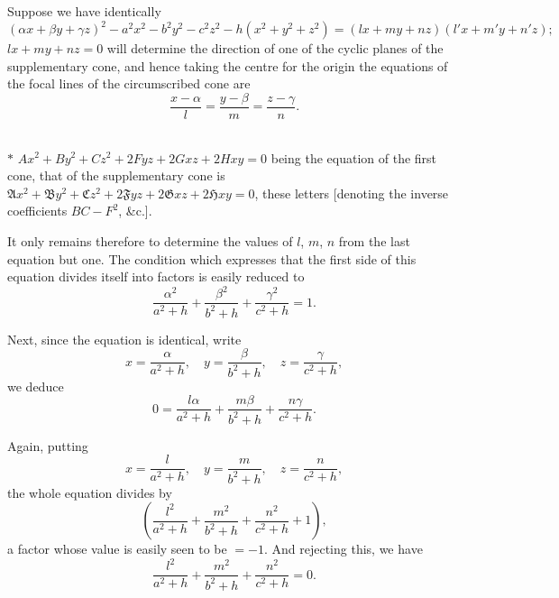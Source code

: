 \documentclass[11pt]{article}
\begin{document}
Suppose we have identically
\[
(\alpha x + \beta y + \gamma z)^{2} - a^{2} x^{2} - b^{2} y^{2} - c^{2} z^{2} - h(x^{2} + y^{2} + z^{2}) = (l x + m y + n z)(l' x + m' y + n' z);
\]
$l x + m y + n z = 0$ will determine the direction of one of the cyclic planes of the supple\-mentary
cone, and hence taking the centre for the origin the equations of the focal
lines of the circumscribed cone are
\[
\frac{x - \alpha}{l} = \frac{y - \beta}{m} = \frac{z - \gamma}{n}.
\]

\medskip
\noindent\hrulefill\\
\footnotesize
$*$ $A x^{2} + B y^{2} + C z^{2} + 2 F y z + 2 G x z + 2 H x y = 0$ being the equation of the first cone, that of the supplementary
cone is $\mathfrak{A} x^{2} + \mathfrak{B} y^{2} + \mathfrak{C} z^{2} + 2 \mathfrak{F} y z + 2 \mathfrak{G} x z + 2 \mathfrak{H} x y = 0$, these letters [denoting the inverse coefficients $BC - F^{2}$, \&c.].
\normalsize

\bigskip

\noindent It only remains therefore to determine the values of $l$, $m$, $n$ from the last equation
but one. The condition which expresses that the first side of this equation divides
itself into factors is easily reduced to
\[
\frac{\alpha^{2}}{a^{2} + h} + \frac{\beta^{2}}{b^{2} + h} + \frac{\gamma^{2}}{c^{2} + h} = 1. \tag{A}
\]

Next, since the equation is identical, write
\[
x = \frac{\alpha}{a^{2} + h}, \quad y = \frac{\beta}{b^{2} + h}, \quad z = \frac{\gamma}{c^{2} + h},
\]
we deduce
\[
0 = \frac{l \alpha}{a^{2} + h} + \frac{m \beta}{b^{2} + h} + \frac{n \gamma}{c^{2} + h}. \tag{B}
\]

Again, putting
\[
x = \frac{l}{a^{2} + h}, \quad y = \frac{m}{b^{2} + h}, \quad z = \frac{n}{c^{2} + h},
\]
the whole equation divides by
\[
\left(\frac{l^{2}}{a^{2} + h} + \frac{m^{2}}{b^{2} + h} + \frac{n^{2}}{c^{2} + h} + 1\right),
\]
a factor whose value is easily seen to be $= -1$. And rejecting this, we have
\[
\frac{l^{2}}{a^{2} + h} + \frac{m^{2}}{b^{2} + h} + \frac{n^{2}}{c^{2} + h} = 0. \tag{C}
\]
\end{document}
